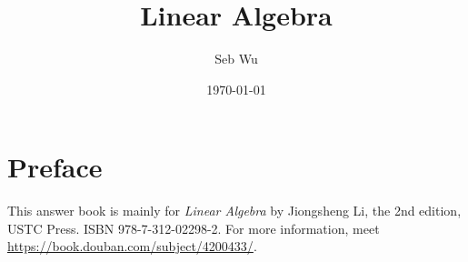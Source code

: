 \documentclass{book}
\title{\bf Linear Algebra}
\author{Seb Wu}
\date{\today}
\begin{document}
\frontmatter
	\fancyhead{}
	\fancyhead[OR,EL]{\thepage}
	\fancyhead[C,OL,ER]{}
	\fancyfoot{}
\maketitle
\chapter{Preface}
	This answer book is mainly for \emph{Linear Algebra} by Jiongsheng Li, the 2nd edition, USTC Press. ISBN 978-7-312-02298-2. For more information, meet \url{https://book.douban.com/subject/4200433/}.
\cleardoublepage
{}
\tableofcontents
\fancyhead[C]{\leftmark}

\mainmatter
	\mainmatter
	\fancyhead{}
	\fancyhead[OR,EL]{\thepage}
	\fancyhead[C]{\leftmark}
	\fancyfoot{}








\end{document}
